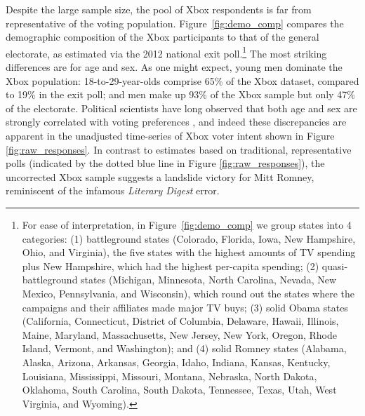 \documentclass[preprint,authoryear,12pt]{elsarticle}
\begin{document}
Despite the large sample size, the pool of Xbox respondents is far from representative of the voting population.
Figure~\ref{fig:demo_comp} compares the demographic composition of the Xbox participants to that of the general electorate, as estimated via
the 2012 national exit poll.\footnote{For ease of interpretation, in Figure~\ref{fig:demo_comp} we group states into 4 categories: (1) battleground states
(Colorado, Florida, Iowa, New Hampshire, Ohio, and Virginia), the five
states with the highest amounts of TV spending plus New Hampshire, which had the highest per-capita spending; (2) quasi-battleground
  states (Michigan, Minnesota, North Carolina, Nevada, New Mexico, Pennsylvania,
  and Wisconsin), which round out the states where the campaigns and their affiliates made major TV buys; (3) solid Obama states (California, Connecticut, District
  of Columbia, Delaware, Hawaii, Illinois, Maine, Maryland, Massachusetts, New
  Jersey, New York, Oregon, Rhode Island, Vermont, and Washington); and (4) solid Romney
  states (Alabama, Alaska, Arizona, Arkansas, Georgia, Idaho, Indiana,
  Kansas, Kentucky, Louisiana, Mississippi, Missouri, Montana, Nebraska, North
  Dakota, Oklahoma, South Carolina, South Dakota, Tennessee, Texas, Utah, West
  Virginia, and Wyoming).}
The most
striking differences are for age and sex. As one might expect, young men dominate the Xbox population: 18-to-29-year-olds
comprise 65\% of the Xbox dataset, compared to 19\% in the exit poll; and men make up
93\% of the Xbox sample but only 47\% of the electorate.  Political
scientists have long observed that both age and sex are strongly correlated with
voting preferences \citep{kaufmann1999changing}, and indeed these discrepancies are apparent in the unadjusted
time-series of Xbox voter intent shown in Figure \ref{fig:raw_responses}.
In contrast to estimates based on traditional, representative polls (indicated by the dotted blue line in Figure \ref{fig:raw_responses}),
the uncorrected Xbox sample suggests a landslide victory for Mitt Romney, reminiscent of the
infamous \textsl{Literary Digest} error.
\end{document}
